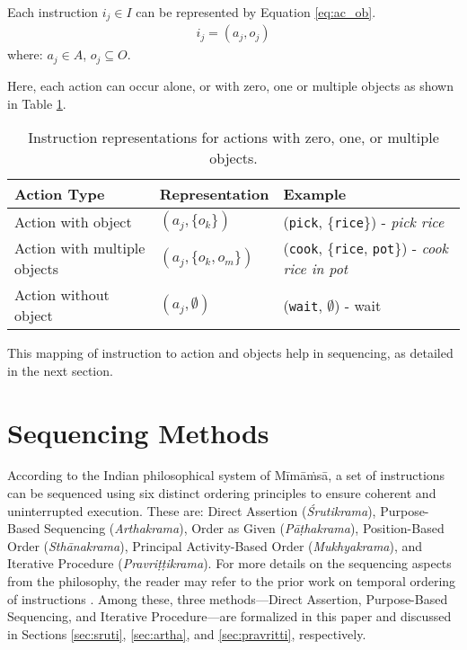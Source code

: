 \documentclass[a4paper,11pt]{lmcs}
\newcommand{\mimamsa}{M\={i}m\={a}\.ms\={a}}
\begin{document}
Each instruction $i_j \in I$ can be represented by Equation \ref{eq:ac_ob}.
\begin{eqnarray}
\label{eq:ac_ob}
 i_j = (a_j,o_j)
\end{eqnarray}
where: $a_j \in A$, $o_j \subseteq O$.

Here, each action can occur alone, or with zero, one or multiple objects as shown in Table \ref{tab:ac_ob}.
\begin{table}[h!]
\label{tab:ac_ob}
\centering
\begin{tabular}{|l|l|l|}
\hline
\textbf{Action Type}           & \textbf{Representation}             & \textbf{Example}                \\
\hline
Action with object             & $(a_j, \{o_k\})$                    & (\texttt{pick}, \{\texttt{rice}\}) - \textit{pick rice} \\
\hline
Action with multiple objects   & $(a_j, \{o_k, o_m\})$               & (\texttt{cook}, \{\texttt{rice}, \texttt{pot}\}) - \textit{cook rice in pot}\\
\hline
Action without object          & $(a_j, \emptyset)$                  & (\texttt{wait}, $\emptyset$)  - wait  \\
\hline
\end{tabular}
\caption{Instruction representations for actions with zero, one, or multiple objects.}
\end{table}

\medskip
\noindent

This mapping of instruction to action and objects help in sequencing, as detailed in the next section.

\section{Sequencing Methods}
\label{sec:seq}
According to the Indian philosophical system of \mimamsa, a set of instructions can be sequenced using six distinct ordering principles to ensure coherent and uninterrupted execution. These are: Direct Assertion (\textit{Śrutikrama}), Purpose-Based Sequencing (\textit{Arthakrama}), Order as Given (\textit{P\={a}\d{t}hakrama}), Position-Based Order (\textit{Sth\={a}nakrama}), Principal Activity-Based Order (\textit{Mukhyakrama}), and Iterative Procedure (\textit{Pravri\d{t}\d{t}ikrama}). For more details on the sequencing aspects from the philosophy, the reader may refer to the prior work on temporal ordering of instructions \cite{llm_mira}. Among these, three methods—Direct Assertion, Purpose-Based Sequencing, and Iterative Procedure—are formalized in this paper and discussed in Sections \ref{sec:sruti}, \ref{sec:artha}, and \ref{sec:pravritti}, respectively.
\end{document}
